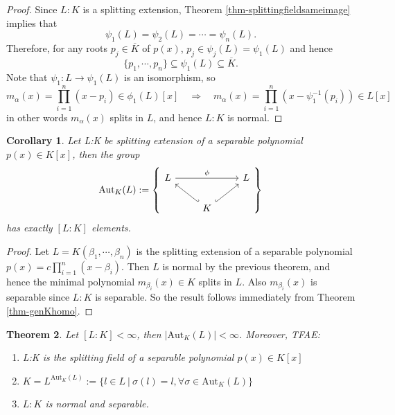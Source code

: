 \documentclass[11pt]{book}
\newtheorem{theorem}{Theorem}[section]
\newtheorem{corollary}[theorem]{Corollary}
\begin{document}
\begin{proof}
    Since $L:K$ is a splitting extension, Theorem \ref{thm-splittingfieldsameimage} implies that
    $$\psi_1(L)=\psi_2(L)=\cdots=\psi_n(L).$$
    Therefore, for any roots $p_j \in \overline{K}$ of $p(x)$, $p_j\in \psi_j(L)=\psi_1(L)$ and hence 
    $$\{p_1,\cdots,p_n\} \subseteq \psi_1(L) \subseteq \overline{K}.$$ 
    Note that $\psi_1: L\rightarrow \psi_1(L)$ is an isomorphism, so 
    $$m_{\alpha}(x)= \prod_{i=1}^n (x-p_i) \in \phi_1(L)[x] \quad \Rightarrow \quad m_{\alpha}(x)= \prod_{i=1}^n (x-\psi_1^{-1}(p_i)) \in L[x]$$
    in other words $m_\alpha(x)$ splits in $L$, and hence $L:K$ is normal.
\end{proof}
\begin{corollary} \label{cor-groupsize}
    Let L:K be splitting extension of a separable polynomial $p(x)\in K[x]$, then the group $$\mathrm{Aut}_K(L):=\left\{\begin{tikzcd}
	L && L \\
	& K
	\arrow["\phi", from=1-1, to=1-3]
	\arrow[hook', from=2-2, to=1-1]
	\arrow[hook, from=2-2, to=1-3]
\end{tikzcd}\right\}$$
has exactly $[L:K]$ elements.
\end{corollary}
\begin{proof}
    Let $L=K(\beta_1,\cdots,\beta_n)$ is the splitting extension of a separable polynomial $p(x)=c\prod_{i=1}^n (x-\beta_i)$. Then $L$ is normal by the previous theorem, and hence the minimal polynomial $m_{\beta_i}(x) \in K$ 
    splits in $L$. Also $m_{\beta_i}(x)$ is separable since $L:K$ is separable. So the result follows immediately from Theorem \ref{thm-genKhomo}.
\end{proof}
\begin{theorem} \label{thm-galcondition}
    Let $[L:K] < \infty$, then $|\mathrm{Aut}_K(L)| < \infty$. Moreover, TFAE:
    \begin{enumerate}
        \item L:K is the splitting field of a separable polynomial $p(x)\in K[x]$
        \item  $K=L^{\mathrm{Aut}_K(L)} :=\{l\in L\ |\ \sigma(l)=l,\forall \sigma \in \mathrm{Aut}_K(L)\}$
        \item $L:K$ is normal and separable.
    \end{enumerate}
    
\end{theorem}
\end{document}
